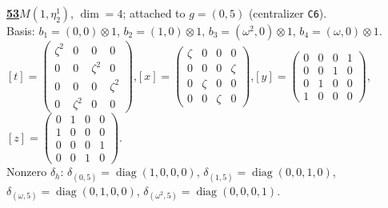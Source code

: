 \begin{samepage}\noindent\textbf{\underline{53}}\quad $M(1,\eta^{1}_{2})$, $\dim=4$; attached to $g=(0,5)$ (centralizer \texttt{C6}).\\
Basis: $b_{1}=(0,0)\otimes 1$, $b_{2}=(1,0)\otimes 1$, $b_{3}=(\omega^2,0)\otimes 1$, $b_{4}=(\omega,0)\otimes 1$.\\
$[t]=\left(\begin{smallmatrix} \zeta^2 & 0 & 0 & 0 \\ 0 & 0 & \zeta^2 & 0 \\ 0 & 0 & 0 & \zeta^2 \\ 0 & \zeta^2 & 0 & 0 \end{smallmatrix}\right)$,\quad $[x]=\left(\begin{smallmatrix} \zeta & 0 & 0 & 0 \\ 0 & 0 & 0 & \zeta \\ 0 & \zeta & 0 & 0 \\ 0 & 0 & \zeta & 0 \end{smallmatrix}\right)$,\quad $[y]=\left(\begin{smallmatrix} 0 & 0 & 0 & 1 \\ 0 & 0 & 1 & 0 \\ 0 & 1 & 0 & 0 \\ 1 & 0 & 0 & 0 \end{smallmatrix}\right)$,\quad $[z]=\left(\begin{smallmatrix} 0 & 1 & 0 & 0 \\ 1 & 0 & 0 & 0 \\ 0 & 0 & 0 & 1 \\ 0 & 0 & 1 & 0 \end{smallmatrix}\right)$.\\
Nonzero $\delta_h$: $\delta_{(0,5)}=\operatorname{diag}(1,0,0,0)$, $\delta_{(1,5)}=\operatorname{diag}(0,0,1,0)$, $\delta_{(\omega,5)}=\operatorname{diag}(0,1,0,0)$, $\delta_{(\omega^2,5)}=\operatorname{diag}(0,0,0,1)$.\end{samepage}
\medskip

